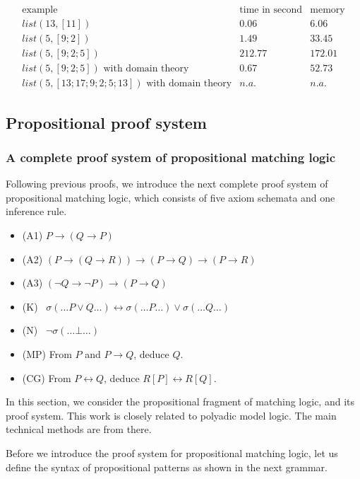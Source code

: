 \documentclass{article}
\theoremstyle{plain}
\begin{document}
\begin{equation*}
\begin{array}{ccc}
\text{example} & \text{time in second} & \text{memory} \\ 
list(13,[11]) & 0.06 & 6.06 \\ 
list(5,[9;2]) & 1.49 & 33.45 \\ 
list(5,[9;2;5]) & 212.77 & 172.01 \\ 
list(5,[9;2;5]) \text{ with domain theory} & 0.67 & 52.73 \\ 
list(5,[13;17;9;2;5;13]) \text{ with domain theory} & n.a. & n.a.
\end{array} 
\end{equation*}

\subsection{Propositional proof system}

\subsubsection{A complete proof system of propositional matching logic}
\label{sec:completepropproofsystem}

Following previous proofs, we introduce the next complete proof system of propositional matching logic, which consists of five axiom schemata and one inference rule.

\begin{itemize}
\item (A1) $P \to (Q \to P)$
\item (A2) $(P \to (Q \to R)) \to (P \to Q) \to (P \to R)$
\item (A3) $(\neg Q \to \neg P) \to (P \to Q)$
\item (K){\ } $\sigma(\dots P \vee Q \dots) \leftrightarrow \sigma(\dots P \dots) \vee \sigma(\dots Q \dots)$ 
\item (N){\ } $\neg \sigma(\dots \bot \dots)$
\item (MP) From $P$ and $P \to Q$, deduce $Q$.
\item (CG) From $P \leftrightarrow Q$, deduce $R[P] \leftrightarrow R[Q]$.
\end{itemize}

In this section, we consider the propositional fragment of matching logic, and its proof system. This work is closely related to polyadic model logic. The main technical methods are from there.

Before we introduce the proof system for propositional matching logic, let us define the syntax of propositional patterns as shown in the next grammar.
\end{document}
